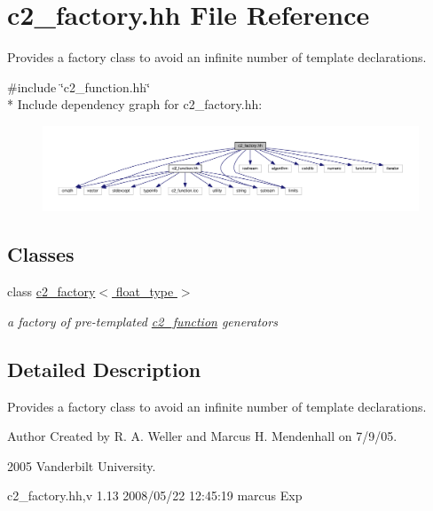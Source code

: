 \hypertarget{c2__factory_8hh}{}\section{c2\+\_\+factory.\+hh File Reference}
\label{c2__factory_8hh}


Provides a factory class to avoid an infinite number of template declarations.  


{\ttfamily \#include \char`\"{}c2\+\_\+function.\+hh\char`\"{}}\\*
Include dependency graph for c2\+\_\+factory.\+hh\+:
\nopagebreak
\begin{figure}[H]
\begin{center}
\leavevmode
\includegraphics[width=350pt]{c2__factory_8hh__incl}
\end{center}
\end{figure}
\subsection*{Classes}
\begin{DoxyCompactItemize}
\item 
class \hyperlink{classc2__factory}{c2\+\_\+factory$<$ float\+\_\+type $>$}
\begin{DoxyCompactList}\small\item\em a factory of pre-\/templated \hyperlink{classc2__function}{c2\+\_\+function} generators \end{DoxyCompactList}\end{DoxyCompactItemize}


\subsection{Detailed Description}
Provides a factory class to avoid an infinite number of template declarations. 

\begin{DoxyAuthor}{Author}
Created by R. A. Weller and Marcus H. Mendenhall on 7/9/05. 

2005 Vanderbilt University. \begin{DoxyVerb}   \version c2_factory.hh,v 1.13 2008/05/22 12:45:19 marcus Exp\end{DoxyVerb}

\end{DoxyAuthor}
